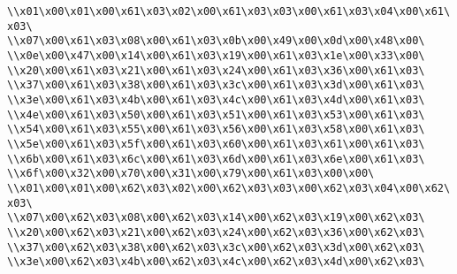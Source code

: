 \verb|\\x01\x00\x01\x00\x61\x03\x02\x00\x61\x03\x03\x00\x61\x03\x04\x00\x61\x03\|\newline
\verb|\\x07\x00\x61\x03\x08\x00\x61\x03\x0b\x00\x49\x00\x0d\x00\x48\x00\|\newline
\verb|\\x0e\x00\x47\x00\x14\x00\x61\x03\x19\x00\x61\x03\x1e\x00\x33\x00\|\newline
\verb|\\x20\x00\x61\x03\x21\x00\x61\x03\x24\x00\x61\x03\x36\x00\x61\x03\|\newline
\verb|\\x37\x00\x61\x03\x38\x00\x61\x03\x3c\x00\x61\x03\x3d\x00\x61\x03\|\newline
\verb|\\x3e\x00\x61\x03\x4b\x00\x61\x03\x4c\x00\x61\x03\x4d\x00\x61\x03\|\newline
\verb|\\x4e\x00\x61\x03\x50\x00\x61\x03\x51\x00\x61\x03\x53\x00\x61\x03\|\newline
\verb|\\x54\x00\x61\x03\x55\x00\x61\x03\x56\x00\x61\x03\x58\x00\x61\x03\|\newline
\verb|\\x5e\x00\x61\x03\x5f\x00\x61\x03\x60\x00\x61\x03\x61\x00\x61\x03\|\newline
\verb|\\x6b\x00\x61\x03\x6c\x00\x61\x03\x6d\x00\x61\x03\x6e\x00\x61\x03\|\newline
\verb|\\x6f\x00\x32\x00\x70\x00\x31\x00\x79\x00\x61\x03\x00\x00\|\newline
\verb|\\x01\x00\x01\x00\x62\x03\x02\x00\x62\x03\x03\x00\x62\x03\x04\x00\x62\x03\|\newline
\verb|\\x07\x00\x62\x03\x08\x00\x62\x03\x14\x00\x62\x03\x19\x00\x62\x03\|\newline
\verb|\\x20\x00\x62\x03\x21\x00\x62\x03\x24\x00\x62\x03\x36\x00\x62\x03\|\newline
\verb|\\x37\x00\x62\x03\x38\x00\x62\x03\x3c\x00\x62\x03\x3d\x00\x62\x03\|\newline
\verb|\\x3e\x00\x62\x03\x4b\x00\x62\x03\x4c\x00\x62\x03\x4d\x00\x62\x03\|\newline
